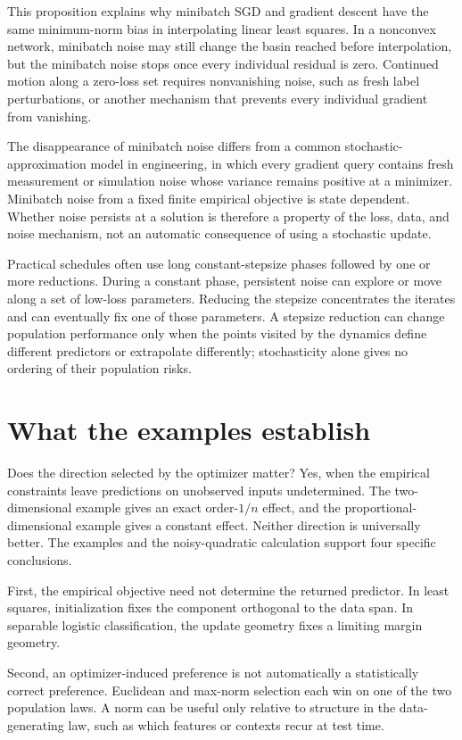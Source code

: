 \documentclass[11pt,twoside]{article}
\theoremstyle{definition}
\theoremstyle{remark}
\begin{document}
This proposition explains why minibatch SGD and gradient descent have the
same minimum-norm bias in interpolating linear least squares. In a nonconvex
network, minibatch noise may still change the basin reached before
interpolation, but the minibatch noise stops once every individual residual is
zero. Continued motion along a zero-loss set requires nonvanishing noise, such
as fresh label perturbations, or another mechanism that prevents every
individual gradient from vanishing.

The disappearance of minibatch noise differs from a common
stochastic-approximation model in engineering, in
which every gradient query contains fresh measurement or simulation noise
whose variance remains positive at a minimizer. Minibatch noise from a fixed
finite empirical objective is state dependent. Whether noise persists at a
solution is therefore a property of the loss, data, and noise mechanism, not
an automatic consequence of using a stochastic update.

Practical schedules often use long constant-stepsize phases followed by one
or more reductions. During a constant phase, persistent noise can explore or
move along a set of low-loss parameters. Reducing the stepsize concentrates
the iterates and can eventually fix one of those parameters. A stepsize
reduction can change population performance only when the points visited by
the dynamics define different predictors or extrapolate differently;
stochasticity alone gives no ordering of their population risks.

\section{What the examples establish}
\label{sec:scope}

Does the direction selected by the optimizer matter? Yes, when the empirical
constraints leave predictions on unobserved inputs undetermined. The
two-dimensional example gives an exact order-$1/n$ effect, and the
proportional-dimensional example gives a constant effect. Neither direction
is universally better. The examples and the noisy-quadratic calculation
support four specific conclusions.

First, the empirical objective need not determine the returned predictor.
In least squares, initialization fixes the component orthogonal to the data
span. In separable logistic classification, the update geometry fixes a
limiting margin geometry.

Second, an optimizer-induced preference is not automatically a statistically
correct preference. Euclidean and max-norm selection each win on one of the
two population laws. A norm can be useful only relative to structure in the
data-generating law, such as which features or contexts recur at test time.
\end{document}
